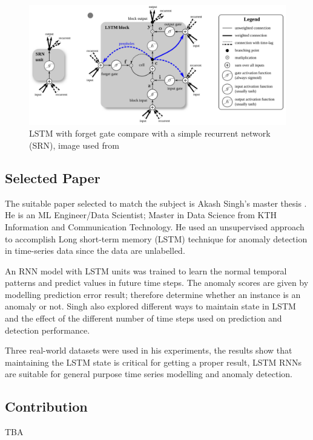\documentclass{article}
\begin{document}
\begin{figure}[htb]
	    \centering
\includegraphics[scale=0.142]{png/forgetgate.png}
    \caption{LSTM with forget gate compare with a simple recurrent network
(SRN), image used from \cite{6-forgetgategraph}}
    \label{fig:forgetgate}
\end{figure}


\subsection{Selected Paper}

The suitable paper selected to match the subject is Akash Singh's master thesis
\cite{7-lstmthisis}. He is an ML Engineer/Data Scientist; Master in Data
Science
from KTH Information and Communication Technology. He used an unsupervised
approach to accomplish Long short-term memory (LSTM) technique for anomaly
detection in time-series data since the data are unlabelled. 

An RNN model with LSTM units was trained to learn the normal temporal patterns
and predict values in future time steps. The anomaly scores are given by
modelling prediction error result; therefore determine whether an instance is
an
anomaly or not. Singh also explored different ways to maintain state in LSTM
and the effect of the different number of time steps used on prediction and
detection performance.

Three real-world datasets were used in his experiments, the results show that
maintaining the LSTM state is critical for getting a proper result, LSTM RNNs
are
suitable for general purpose time series modelling and anomaly detection.

\subsection{Contribution}

TBA 
\end{document}
